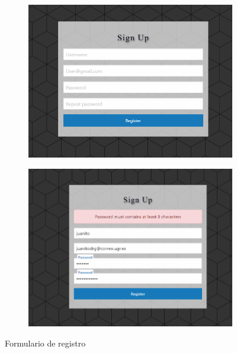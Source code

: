 \begin{figure}[!ht]
  \centering
  \begin{subfigure}{0.7\textwidth}
    \includegraphics[width=\linewidth]{imagenes/register.png}
    \label{fig:imagen1}
  \end{subfigure}
  \hfill
  \begin{subfigure}{0.7\textwidth}
    \includegraphics[width=\linewidth]{imagenes/register2.png}
    \label{fig:imagen2}
  \end{subfigure}

  \caption{Formulario de registro}
  \label{fig:general}
\end{figure}\vspace{1cm}

